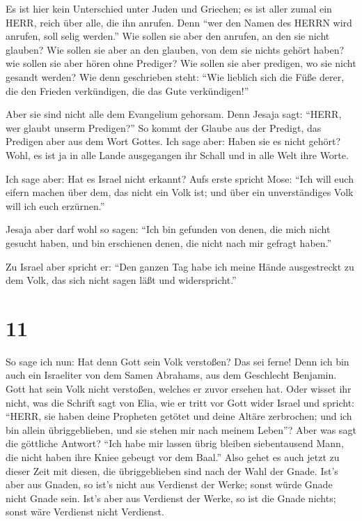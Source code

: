  Es ist hier kein Unterschied unter Juden und Griechen; es
ist aller zumal ein HERR, reich über alle, die ihn anrufen.
 Denn ``wer den Namen des HERRN wird anrufen, soll selig
werden.''  Wie sollen sie aber den anrufen, an den sie
nicht glauben? Wie sollen sie aber an den glauben, von dem sie nichts
gehört haben? wie sollen sie aber hören ohne Prediger?  Wie
sollen sie aber predigen, wo sie nicht gesandt werden? Wie denn
geschrieben steht: ``Wie lieblich sich die Füße derer, die den Frieden
verkündigen, die das Gute verkündigen!''

 Aber sie sind nicht alle dem Evangelium gehorsam. Denn
Jesaja sagt: ``HERR, wer glaubt unserm Predigen?''  So
kommt der Glaube aus der Predigt, das Predigen aber aus dem Wort Gottes.
 Ich sage aber: Haben sie es nicht gehört? Wohl, es ist ja
in alle Lande ausgegangen ihr Schall und in alle Welt ihre Worte.

 Ich sage aber: Hat es Israel nicht erkannt? Aufs erste
spricht Mose: ``Ich will euch eifern machen über dem, das nicht ein Volk
ist; und über ein unverständiges Volk will ich euch erzürnen.''

 Jesaja aber darf wohl so sagen: ``Ich bin gefunden von
denen, die mich nicht gesucht haben, und bin erschienen denen, die nicht
nach mir gefragt haben.''

 Zu Israel aber spricht er: ``Den ganzen Tag habe ich meine
Hände ausgestreckt zu dem Volk, das sich nicht sagen läßt und
widerspricht.''

\hypertarget{section-10}{%
\section{11}\label{section-10}}

 So sage ich nun: Hat denn Gott sein Volk verstoßen? Das sei
ferne! Denn ich bin auch ein Israeliter von dem Samen Abrahams, aus dem
Geschlecht Benjamin.  Gott hat sein Volk nicht verstoßen,
welches er zuvor ersehen hat. Oder wisset ihr nicht, was die Schrift
sagt von Elia, wie er tritt vor Gott wider Israel und spricht:
 ``HERR, sie haben deine Propheten getötet und deine Altäre
zerbrochen; und ich bin allein übriggeblieben, und sie stehen mir nach
meinem Leben''?  Aber was sagt die göttliche Antwort? ``Ich
habe mir lassen übrig bleiben siebentausend Mann, die nicht haben ihre
Kniee gebeugt vor dem Baal.''  Also gehet es auch jetzt zu
dieser Zeit mit diesen, die übriggeblieben sind nach der Wahl der Gnade.
 Ist's aber aus Gnaden, so ist's nicht aus Verdienst der
Werke; sonst würde Gnade nicht Gnade sein. Ist's aber aus Verdienst der
Werke, so ist die Gnade nichts; sonst wäre Verdienst nicht Verdienst.

